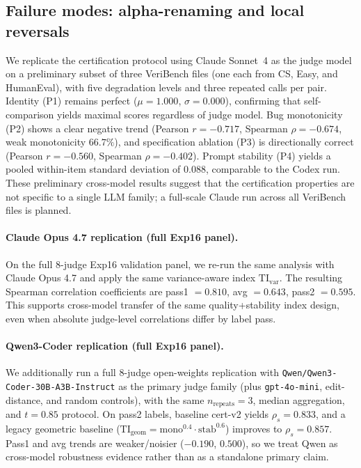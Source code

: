 \documentclass{article}
\begin{document}
\subsection{Failure modes: alpha-renaming and local reversals}
We replicate the certification protocol using Claude Sonnet~4 as the judge model on a preliminary subset of three VeriBench files (one each from CS, Easy, and HumanEval), with five degradation levels and three repeated calls per pair.
Identity (P1) remains perfect ($\mu=1.000$, $\sigma=0.000$), confirming that self-comparison yields maximal scores regardless of judge model.
Bug monotonicity (P2) shows a clear negative trend (Pearson $r=-0.717$, Spearman $\rho=-0.674$, weak monotonicity $66.7\%$), and specification ablation (P3) is directionally correct (Pearson $r=-0.560$, Spearman $\rho=-0.402$).
Prompt stability (P4) yields a pooled within-item standard deviation of $0.088$, comparable to the Codex run.
These preliminary cross-model results suggest that the certification properties are not specific to a single LLM family; a full-scale Claude run across all VeriBench files is planned.

\paragraph{Claude Opus 4.7 replication (full Exp16 panel).}
On the full \(8\)-judge Exp16 validation panel, we re-run the same analysis with Claude Opus 4.7 and apply the same variance-aware index \(\mathrm{TI}_{\mathrm{var}}\).
The resulting Spearman correlation coefficients are pass1 \(=0.810\), avg \(=0.643\), pass2 \(=0.595\).
This supports cross-model transfer of the same quality+stability index design, even when absolute judge-level correlations differ by label pass.

\paragraph{Qwen3-Coder replication (full Exp16 panel).}
We additionally run a full \(8\)-judge open-weights replication with \texttt{Qwen/Qwen3-Coder-30B-A3B-Instruct} as the primary judge family (plus \texttt{gpt-4o-mini}, edit-distance, and random controls), with the same \(n_\text{repeats}=3\), median aggregation, and \(t=0.85\) protocol.
On pass2 labels, baseline cert-v2 yields \(\rho_s=0.833\), and a legacy geometric baseline (\(\mathrm{TI}_{\mathrm{geom}}=\mathrm{mono}^{0.4}\cdot\mathrm{stab}^{0.6}\)) improves to \(\rho_s=0.857\).
Pass1 and avg trends are weaker/noisier (\(-0.190\), \(0.500\)), so we treat Qwen as cross-model robustness evidence rather than as a standalone primary claim.
\end{document}
